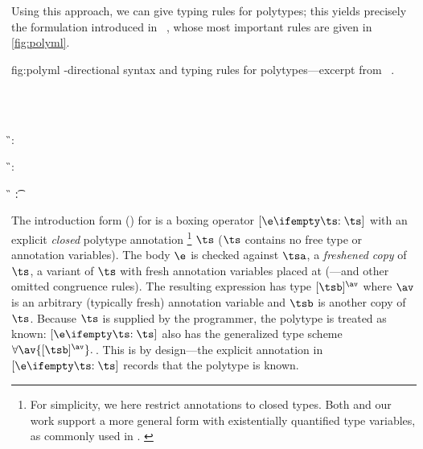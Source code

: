 \documentclass[acmsmall,screen,nonacm%
\Anonymous{,anonymous}{}%
\Final{}{,review}%
]{acmart}
\newcommand{\BBpolyml}{Garrigue-Remy/poly-ml}
\begin{document}
Using this approach, we can give typing rules for polytypes; this
yields precisely the formulation introduced in
\PolyML~\citep*{\BBpolyml}, whose most important rules are given in
\cref{fig:polyml}. 
\begin{mathparfig}[htpb!]
  {fig:polyml}
  {\Geninst-directional syntax and typing rules for polytypes---excerpt from
  \PolyML~\citep*{\BBpolyml}.} 
\begin{bnfgrammar}[\def\bnfsep{\;}]
     \entry[Types]{\t}{
        \tannot \t \av
        \and \tpoly \ts
        \and \dots
     }\\
     \\
\end{bnfgrammar}

    {\G \th \epoly[\ts] \e : \tapoly {\tsb} \av}

    {\G \th \einst \e : \ts}

    {\G \th \eannot \e {} \t : \tb}

    {\annot {\tpoly \ts} {\tannot {\tpoly \tsp} \av}}
\end{mathparfig}
%
%
The introduction form () for \polytypes is a boxing operator
$\epoly[\ts] \e$ with an explicit \emph{closed} polytype annotation%
\footnote{%
  For simplicity, we here restrict \PolyML annotations to closed types. Both
  \citet{\BBpolyml} and our work support a more general form with
  existentially quantified type variables, as commonly used in \OCaml.
  \label{fn/polyml-closed-annotations} 
}
$\ts$ (\ie $\ts$ contains no free type or annotation variables).
%
The body $\e$ is checked against $\tsa$, a \emph{freshened copy} of $\ts$,
\ie a variant of $\ts$ with fresh annotation variables placed at \polytypes
(---and other omitted congruence rules). The resulting
expression has type $\tapoly {\tsb} \av$ where $\av$ is an arbitrary
(typically fresh) annotation variable and $\tsb$ is another copy of
$\ts$. Because $\ts$ is supplied by the programmer, the polytype is treated
as known: $\epoly[\ts] \e$ also has the generalized type scheme $\all \av
{\tapoly {\tsb} \av}$. This is by design---the explicit annotation in
$\epoly[\ts] \e$ records that the polytype is known.
\end{document}
